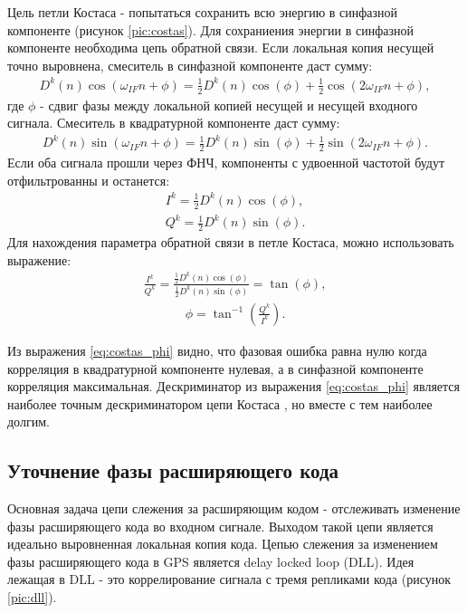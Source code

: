 Цель петли Костаса - попытаться сохранить всю энергию в синфазной компоненте (рисунок \ref{pic:costas}). Для сохраниения энергии
в синфазной
компоненте необходима цепь обратной связи. Если локальная копия несущей точно выровнена, смеситель в 
синфазной компоненте даст сумму:
\begin{eqnarray}
D^k(n)\cos(\omega_{IF}n + \phi) = \frac{1}{2}D^k(n)\cos(\phi) + \frac{1}{2}\cos(2\omega_{IF}n + \phi),
\label{eq:costas_i}
\end{eqnarray}
где ${\phi}$ - сдвиг фазы между локальной копией несущей и несущей входного сигнала. Смеситель в квадратурной
компоненте даст сумму:
\begin{eqnarray}
D^k(n)\sin(\omega_{IF}n + \phi) = \frac{1}{2}D^k(n)\sin(\phi) + \frac{1}{2}\sin(2\omega_{IF}n + \phi).
\label{eq:costas_q}
\end{eqnarray}
Если оба сигнала прошли через ФНЧ, компоненты с удвоенной частотой будут отфильтрованны и останется:
\begin{eqnarray}
I^k = \frac{1}{2}D^k(n)\cos(\phi), \\
Q^k = \frac{1}{2}D^k(n)\sin(\phi).
\label{eq:costas_iq}
\end{eqnarray}
Для нахождения параметра обратной связи в петле Костаса, можно использовать выражение:
\begin{eqnarray}
\frac{I^k}{Q^k} = \frac{\frac{1}{2}D^k(n)\cos(\phi)}{\frac{1}{2}D^k(n)\sin(\phi)} = \tan(\phi),
\label{eq:costas_descr}
\end{eqnarray}
\begin{eqnarray}
\phi = \tan^{-1}({\frac{Q^k}{I^k}}).
\label{eq:costas_phi}
\end{eqnarray}

Из выражения \ref{eq:costas_phi} видно, что фазовая ошибка равна нулю когда корреляция в квадратурной
компоненте нулевая, а в синфазной компоненте корреляция максимальная. Дескриминатор из выражения \ref{eq:costas_phi}
является наиболее точным дескриминатором цепи Костаса \cite{gps}, но вместе с тем наиболее долгим.

\subsection{Уточнение фазы расширяющего кода}
Основная задача цепи слежения за расширяющим кодом - отслеживать изменение фазы расширяющего кода во входном
сигнале. Выходом такой цепи является идеально выровненная локальная копия кода. Цепью слежения за изменением
фазы расширяющего кода в GPS является delay locked loop (DLL). Идея лежащая в DLL - это коррелирование
сигнала с тремя репликами кода (рисунок \ref{pic:dll}).


